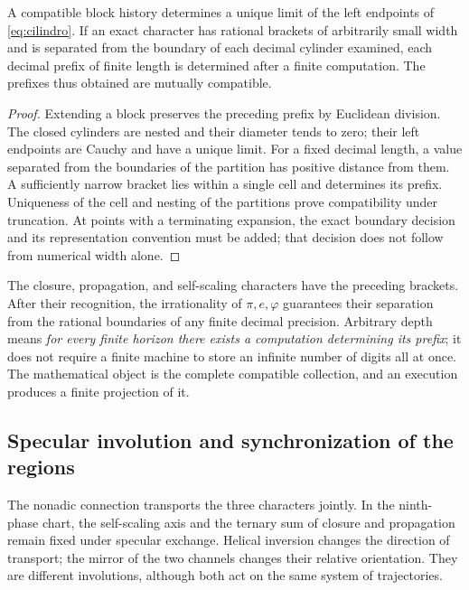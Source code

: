 \begin{theorem}
A compatible block history determines a unique limit of the left endpoints of \eqref{eq:cilindro}. If an exact character has rational brackets of arbitrarily small width and is separated from the boundary of each decimal cylinder examined, each decimal prefix of finite length is determined after a finite computation. The prefixes thus obtained are mutually compatible.
\end{theorem}
\begin{proof}
Extending a block preserves the preceding prefix by Euclidean division. The closed cylinders are nested and their diameter tends to zero; their left endpoints are Cauchy and have a unique limit. For a fixed decimal length, a value separated from the boundaries of the partition has positive distance from them. A sufficiently narrow bracket lies within a single cell and determines its prefix. Uniqueness of the cell and nesting of the partitions prove compatibility under truncation. At points with a terminating expansion, the exact boundary decision and its representation convention must be added; that decision does not follow from numerical width alone.
\end{proof}

The closure, propagation, and self-scaling characters have the preceding brackets. After their recognition, the irrationality of \(\pi,e,\varphi\) guarantees their separation from the rational boundaries of any finite decimal precision. Arbitrary depth means \emph{for every finite horizon there exists a computation determining its prefix}; it does not require a finite machine to store an infinite number of digits all at once. The mathematical object is the complete compatible collection, and an execution produces a finite projection of it.

\subsection{Specular involution and synchronization of the regions}

The nonadic connection transports the three characters jointly. In the ninth-phase chart, the self-scaling axis and the ternary sum of closure and propagation remain fixed under specular exchange. Helical inversion changes the direction of transport; the mirror of the two channels changes their relative orientation. They are different involutions, although both act on the same system of trajectories.

